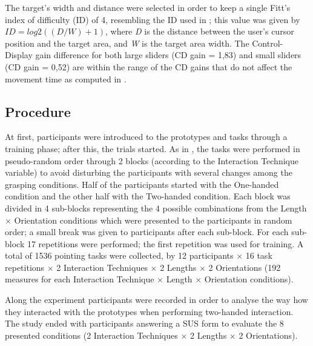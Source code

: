 \documentclass{sigchi}
\begin{document}
The target’s width and distance were selected in order to keep a single Fitt’s index of difficulty  (ID) of 4, resembling the ID used in \cite{Buck:Motor}; this value was given by $ID = log2((D/W)+1)$, where \textit{D} is the distance between the user’s cursor position and the target area, and \textit{W} is the target area width. The Control-Display gain difference for both large sliders (CD gain = 1,83) and small sliders (CD gain = 0,52) are within the range of the CD gains that do not affect the movement time as computed in \cite{Buck:Motor}.

\subsection{Procedure}
At first, participants were introduced to the prototypes and tasks through a training phase; after this, the trials started. As in \cite{Grossman:2005:BCE:1054972.1055012}, the tasks were performed in pseudo-random order through 2 blocks (according to the Interaction Technique variable) to avoid disturbing the participants with several changes among the grasping conditions. Half of the participants started with the One-handed condition and the other half with the Two-handed condition. Each block was divided in 4 sub-blocks representing the 4 possible combinations from the Length $\times$ Orientation conditions which were presented to the participants in random order; a small break was given to participants after each sub-block. For each sub-block 17 repetitions were performed; the first repetition was used for training. A total of 1536 pointing tasks were collected, by 12 participants $\times$ 16 task repetitions $\times$ 2 Interaction Techniques $\times$ 2 Lengths $\times$ 2 Orientations (192 measures for each Interaction Technique $\times$ Length $\times$ Orientation conditions).

Along the experiment participants were recorded in order to analyse the way how they interacted with the prototypes when performing two-handed interaction. The study ended with participants answering a SUS form to evaluate the 8 presented conditions (2 Interaction Techniques $\times$ 2 Lengths $\times$ 2 Orientations).
\end{document}
